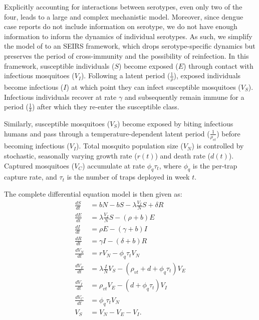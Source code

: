 \documentclass[10pt,letterpaper]{article}
\begin{document}
Explicitly accounting for interactions between serotypes, even only two of the four, leads to a large and complex mechanistic model.
Moreover, since dengue case reports do not include information on serotype, we do not have enough information to inform the dynamics of individual serotypes.
As such, we simplify the model of \cite{Wearing2006} to an SEIRS framework, which drops serotype-specific dynamics but preserves the period of cross-immunity and the possibility of reinfection.
In this framework, susceptible individuals ($S$) become exposed ($E$) through contact with infectious mosquitoes ($V_I$).
Following a latent period ($\frac{1}{\rho}$), exposed individuals become infectious ($I$) at which point they can infect susceptible mosquitoes ($V_S$).
Infectious individuals recover at rate $\gamma$ and subsequently remain immune for a period ($\frac{1}{\delta}$) after which they re-enter the susceptible class.

Similarly, susceptible mosquitoes ($V_S$) become exposed by biting infectious humans and pass through a temperature-dependent latent period ($\frac{1}{\rho_{vt}}$) before becoming infectious ($V_I$).
Total mosquito population size ($V_N$) is controlled by stochastic, seasonally varying growth rate ($r(t)$) and death rate ($d(t)$).
Captured mosquitoes ($V_C$) accumulate at rate $\phi_q \tau_t$, where $\phi_q$ is the per-trap capture rate, and $\tau_t$ is the number of traps deployed in week $t$.

The complete differential equation model is then given as:
\begin{align} 
\frac{dS}{dt} &= bN - bS - \lambda \frac{V_{I}}{N} S + \delta R\\
\frac{dE}{dt} &= \lambda \frac{V_{I}}{N} S - (\rho + b)E\\
\frac{dI}{dt} &= \rho E - (\gamma + b)I\\
\frac{dR}{dt} &= \gamma I - (\delta + b)R\\
\frac{dV_N}{dt} & = r V_N - \phi_q \tau_t V_N \\
\frac{dV_E}{dt} &= \lambda \frac{I}{N} V_S - (\rho_{vt} + d + \phi_q \tau_t)V_E\\
\frac{dV_I}{dt} &= \rho_{vt} V_E - (d + \phi_q \tau_t) V_I\\
\frac{dV_C}{dt} & = \phi_q \tau_t V_N\\
V_S &= V_N - V_E - V_I.
\end{align}
\end{document}
